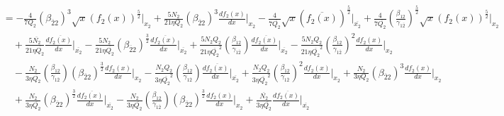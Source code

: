 \documentclass[fleqn, 10pt]{article}
\begin{document}
\begin{equation*}
    \begin{split}
        &=   - \frac{4}{7 Q_{2}} (\beta_{\overline{2}2})^{3} \sqrt{x} (f_{2}(x))^\frac{5}{2} \Bigg|_{x_{2}} +  \frac{5 N_{2}}{21 \eta Q_{2}} (\beta_{\overline{2}2})^{3} \frac{df_{2}(x)}{dx} \Bigg|_{x_{2}} -  \frac{4}{7 \overline{Q_{2}}} \sqrt{x} (\overline{f_{2}(x)})^{\frac{5}{2}} \Bigg|_{\overline{x_{2}}} +   \frac{4}{7 \overline{Q_{2}}} \left( \frac{\beta_{12}}{\gamma_{1\overline{2}}}\right)^\frac{5}{2} \sqrt{x} (f_{2}(x))^\frac{5}{2} \Bigg|_{x_{2}}  \\ & \quad + \frac{5 \overline{N_{2}}}{21 \eta \overline{Q_{2}}}   \frac{d\overline{f_{2}(x)}}{dx} \Bigg|_{\overline{x_{2}}} - \frac{5 N_{2}}{21 \eta \overline{Q_{2}}} (\beta_{\overline{2}2})^\frac{3}{2}   \frac{d\overline{f_{2}(x)}}{dx} \Bigg|_{\overline{x_{2}}} + \frac{5 N_{2} Q_{2}}{21 \eta \overline{Q_{2}}^{2}} \left( \frac{\beta_{12}}{\gamma_{1\overline{2}}}\right)   \frac{d\overline{f_{2}(x)}}{dx} \Bigg|_{\overline{x_{2}}} - \frac{5 N_{2} Q_{2}}{21 \eta \overline{Q_{2}}^{2}} \left( \frac{\beta_{12}}{\gamma_{1\overline{2}}}\right)^{2}   \frac{df_{2}(x)}{dx} \Bigg|_{x_{2}} \\ & \quad - \frac{N_{2}}{3\eta \overline{Q_{2}}} \left( \frac{\beta_{12}}{\gamma_{1\overline{2}}}\right) (\beta_{\overline{2}2})^\frac{3}{2}   \frac{df_{2}(x)}{dx} \Bigg|_{x_{2}} - \frac{N_{2} Q_{2}}{3\eta \overline{Q_{2}}^{2}} \left( \frac{\beta_{12}}{\gamma_{1\overline{2}}}\right)   \frac{d\overline{f_{2}(x)}}{dx} \Bigg|_{\overline{x_{2}}} + \frac{N_{2} Q_{2}}{3\eta \overline{Q_{2}}^{2}} \left( \frac{\beta_{12}}{\gamma_{1\overline{2}}}\right)^{2}   \frac{df_{2}(x)}{dx} \Bigg|_{x_{2}} + \frac{N_{2}}{3\eta Q_{2}} (\beta_{\overline{2}2})^{3}   \frac{df_{2}(x)}{dx} \Bigg|_{x_{2}} \\ & \quad  + \frac{N_{2}}{3\eta \overline{Q_{2}}} (\beta_{\overline{2}2})^\frac{3}{2}   \frac{d\overline{f_{2}(x)}}{dx} \Bigg|_{\overline{x_{2}}} - \frac{N_{2}}{3\eta \overline{Q_{2}}} \left( \frac{\beta_{12}}{\gamma_{1\overline{2}}}\right) (\beta_{\overline{2}2})^\frac{3}{2}   \frac{df_{2}(x)}{dx} \Bigg|_{x_{2}} + \frac{\overline{N_{2}}}{3\eta \overline{Q_{2}}}   \frac{d\overline{f_{2}(x)}}{dx} \Bigg|_{\overline{x_{2}}} 
    \end{split}
\end{equation*}
\end{document}
